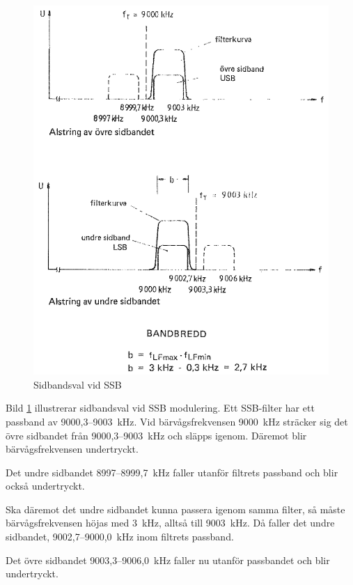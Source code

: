 \begin{figure}
\includegraphics[width=\textwidth]{images/cropped_pdfs/bild_2_1-28.pdf}
\caption{Sidbandsval vid SSB}
\label{fig:BildII1-28}
\end{figure}

Bild \ref{fig:BildII1-28} illustrerar sidbandsval vid SSB modulering.
Ett SSB-filter har ett passband av 9000,3--9003~kHz.
Vid bärvågsfrekvensen 9000~kHz sträcker sig det övre sidbandet från
9000,3--9003~kHz och släpps igenom.
Däremot blir bärvågsfrekvensen undertryckt.

Det undre sidbandet 8997--8999,7~kHz faller utanför filtrets passband och blir
också undertryckt.

Ska däremot det undre sidbandet kunna passera igenom samma filter, så måste
bärvågsfrekvensen höjas med 3~kHz, alltså till 9003~kHz.
Då faller det undre sidbandet, 9002,7--9000,0~kHz inom filtrets passband.

Det övre sidbandet 9003,3--9006,0~kHz faller nu utanför passbandet och blir
undertryckt.

